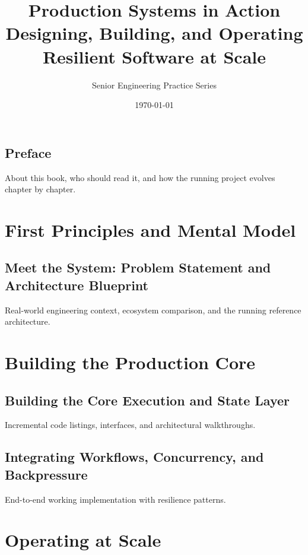 \documentclass[11pt,oneside]{book}
\title{\textbf{Production Systems in Action}\\[0.5em]\large Designing, Building, and Operating Resilient Software at Scale}
\author{Senior Engineering Practice Series}
\date{\today}
\begin{document}
\frontmatter
\maketitle
\tableofcontents

\chapter*{Preface}
About this book, who should read it, and how the running project evolves chapter by chapter.

\mainmatter

\part{First Principles and Mental Model}

\chapter{Meet the System: Problem Statement and Architecture Blueprint}
\label{ch:foundations}
Real-world engineering context, ecosystem comparison, and the running reference architecture.

\part{Building the Production Core}

\chapter{Building the Core Execution and State Layer}
\label{ch:core_engine}
Incremental code listings, interfaces, and architectural walkthroughs.

\chapter{Integrating Workflows, Concurrency, and Backpressure}
\label{ch:workflows}
End-to-end working implementation with resilience patterns.

\part{Operating at Scale}
\end{document}

